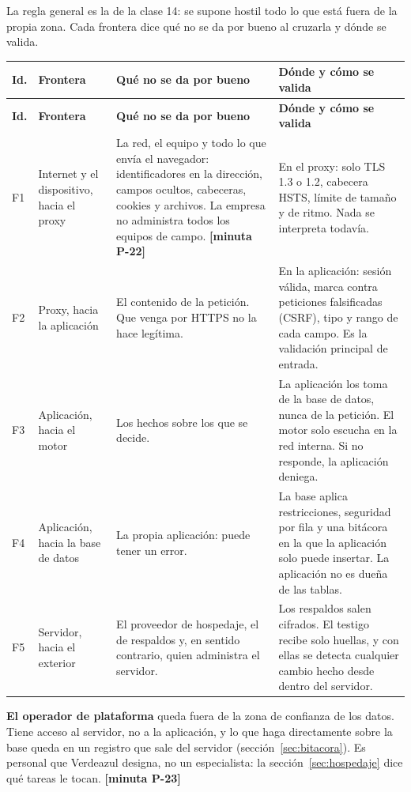 \documentclass[11pt,letterpaper]{article}
\newcommand{\cab}[1]{\textbf{\rmfamily #1}}
\newcommand{\resp}[1]{\textrm{\footnotesize\bfseries [minuta #1]}}
\begin{document}
La regla general es la de la clase 14: se supone hostil todo lo que está fuera de la propia zona. Cada
frontera dice qué no se da por bueno al cruzarla y dónde se valida.

{\small
\renewcommand{\arraystretch}{1.13}
\begin{longtable}{@{}L{0.7cm} L{3.1cm} L{5.5cm} L{6.1cm}@{}}
\toprule
\cab{Id.} & \cab{Frontera} & \cab{Qué no se da por bueno} & \cab{Dónde y cómo se valida} \\
\midrule
\endfirsthead
\toprule
\cab{Id.} & \cab{Frontera} & \cab{Qué no se da por bueno} & \cab{Dónde y cómo se valida} \\
\midrule
\endhead
\bottomrule
\endfoot
F1 & Internet y el dispositivo, hacia el proxy & La red, el equipo y todo lo que envía el navegador: identificadores en la dirección, campos ocultos, cabeceras, cookies y archivos. La empresa no administra todos los equipos de campo. \resp{P-22} & En el proxy: solo TLS 1.3 o 1.2, cabecera HSTS, límite de tamaño y de ritmo. Nada se interpreta todavía. \\
F2 & Proxy, hacia la aplicación & El contenido de la petición. Que venga por HTTPS no la hace legítima. & En la aplicación: sesión válida, marca contra peticiones falsificadas (CSRF), tipo y rango de cada campo. Es la validación principal de entrada. \\
F3 & Aplicación, hacia el motor & Los hechos sobre los que se decide. & La aplicación los toma de la base de datos, nunca de la petición. El motor solo escucha en la red interna. Si no responde, la aplicación deniega. \\
F4 & Aplicación, hacia la base de datos & La propia aplicación: puede tener un error. & La base aplica restricciones, seguridad por fila y una bitácora en la que la aplicación solo puede insertar. La aplicación no es dueña de las tablas. \\
F5 & Servidor, hacia el exterior & El proveedor de hospedaje, el de respaldos y, en sentido contrario, quien administra el servidor. & Los respaldos salen cifrados. El testigo recibe solo huellas, y con ellas se detecta cualquier cambio hecho desde dentro del servidor. \\
\end{longtable}
}

\textbf{El operador de plataforma} queda fuera de la zona de confianza de los datos. Tiene acceso al
servidor, no a la aplicación, y lo que haga directamente sobre la base queda en un registro que sale
del servidor (sección~\ref{sec:bitacora}). Es personal que Verdeazul designa, no un especialista: la
sección~\ref{sec:hospedaje} dice qué tareas le tocan. \resp{P-23}
\end{document}
